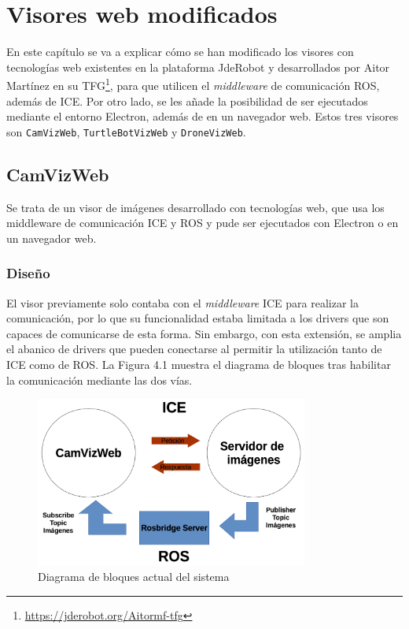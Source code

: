 \chapter{Visores web modificados}\label{cap.Visores}
En este capítulo se va a explicar cómo se han modificado los visores con tecnologías web existentes en la plataforma JdeRobot y desarrollados por Aitor Martínez en su TFG\footnote{\url{https://jderobot.org/Aitormf-tfg}}, para que utilicen el \textit{middleware} de comunicación ROS, además de ICE. Por otro lado, se les añade la posibilidad de ser ejecutados mediante el entorno Electron, además de en un navegador web. Estos tres visores son \texttt{CamVizWeb}, \texttt{TurtleBotVizWeb} y \texttt{DroneVizWeb}.

\section{CamVizWeb}
Se trata de un visor de imágenes desarrollado con tecnologías web, que usa los middleware de comunicación ICE y ROS  y pude ser ejecutados con Electron o en un navegador web.

\subsection{Diseño}
El visor previamente solo contaba con el \textit{middleware} ICE para realizar la comunicación, por lo que su funcionalidad estaba limitada a los drivers que son capaces de comunicarse de esta forma. Sin embargo, con esta extensión, se amplia el abanico de drivers que pueden conectarse al permitir la utilización tanto de ICE como de ROS. La Figura 4.1 muestra el diagrama de bloques tras habilitar la comunicación mediante las dos vías.

\begin{figure}[H]
  \begin{center}
    \includegraphics[width=0.8\textwidth]{figures/esquemacamviz2.png}
		\caption{Diagrama de bloques actual del sistema}
		\label{fig.esquemacamviz2}
		\end{center}
\end{figure}

